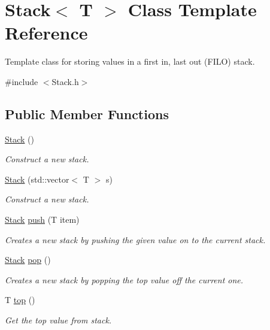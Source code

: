 \hypertarget{class_stack}{}\section{Stack$<$ T $>$ Class Template Reference}
\label{class_stack}


Template class for storing values in a first in, last out (F\+I\+LO) stack.  




{\ttfamily \#include $<$Stack.\+h$>$}

\subsection*{Public Member Functions}
\begin{DoxyCompactItemize}
\item 
\hyperlink{class_stack_aefee698059467258bbd79045aca62a63}{Stack} ()
\begin{DoxyCompactList}\small\item\em Construct a new stack. \end{DoxyCompactList}\item 
\hyperlink{class_stack_acf1a315995090bf9cf957ac84175c82c}{Stack} (std\+::vector$<$ T $>$ s)
\begin{DoxyCompactList}\small\item\em Construct a new stack. \end{DoxyCompactList}\item 
\hyperlink{class_stack}{Stack} \hyperlink{class_stack_a19cc95a7b18fb28d5699c5abefa9107d}{push} (T item)
\begin{DoxyCompactList}\small\item\em Creates a new stack by pushing the given value on to the current stack. \end{DoxyCompactList}\item 
\hyperlink{class_stack}{Stack} \hyperlink{class_stack_a0682e08ce3a10b12697dfd828a83268f}{pop} ()
\begin{DoxyCompactList}\small\item\em Creates a new stack by popping the top value off the current one. \end{DoxyCompactList}\item 
T \hyperlink{class_stack_ad461f6de40c8672dbf743068f4515061}{top} ()
\begin{DoxyCompactList}\small\item\em Get the top value from stack. \end{DoxyCompactList}\item 

\end{DoxyCompactItemize}
